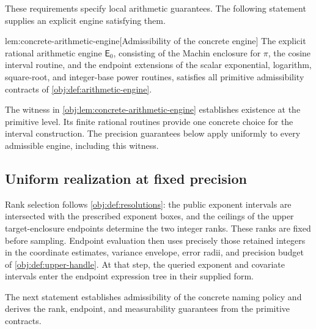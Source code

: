 These requirements specify local arithmetic guarantees. The following statement supplies an explicit engine satisfying them.

\begin{lemmav}{lem:concrete-arithmetic-engine}[Admissibility of the concrete engine]
The explicit rational arithmetic engine \(\mathsf E_0\), consisting of the Machin enclosure for \(\pi\), the cosine interval routine, and the endpoint extensions of the scalar exponential, logarithm, square-root, and integer-base power routines, satisfies all primitive admissibility contracts of \cref{obj:def:arithmetic-engine}.
\end{lemmav}

The witness in \cref{obj:lem:concrete-arithmetic-engine} establishes existence at the primitive level. Its finite rational routines provide one concrete choice for the interval construction. The precision guarantees below apply uniformly to every admissible engine, including this witness.

\subsection{Uniform realization at fixed precision}

Rank selection follows \cref{obj:def:resolutions}: the public exponent intervals are intersected with the prescribed exponent boxes, and the ceilings of the upper target-enclosure endpoints determine the two integer ranks. These ranks are fixed before sampling. Endpoint evaluation then uses precisely those retained integers in the coordinate estimates, variance envelope, error radii, and precision budget of \cref{obj:def:upper-handle}. At that step, the queried exponent and covariate intervals enter the endpoint expression tree in their supplied form.

The next statement establishes admissibility of the concrete naming policy and derives the rank, endpoint, and measurability guarantees from the primitive contracts.

